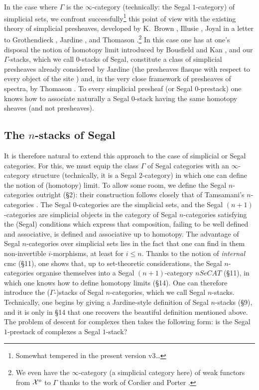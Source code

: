 In the case where $\Gamma$ is the $\infty$-category (technically: the Segal
$1$-category) of simplicial sets, we confront successfully\footnote{Somewhat
tempered in the present version v3\ldots} this point of view with the
existing theory of simplicial presheaves, developed by K.~Brown
\cite{KBrown}, Illusie \cite{Illusie}, Joyal in a letter to Grothendieck
\cite{Joyal}, Jardine \cite{Jardine}, and Thomason \cite{Thomason}.\footnote{We
even have the $\infty$-category (a simplicial category here) of weak functors
from ${\cal X} ^o$ to $\Gamma$ thanks to the work of Cordier and Porter
\cite{CordierPorter}.} In this case one has at one's disposal the notion of
homotopy limit introduced by Bousfield and Kan \cite{BousfieldKan}, and our
$\Gamma$-stacks, which we call $0$-stacks of Segal, constitute a class of
simplicial presheaves already considered by Jardine (the presheaves flasque
with respect to every object of the site \cite{Jardine}) and, in the very
close framework of presheaves of spectra, by Thomason \cite{Thomason}. To
every simplicial presheaf (or Segal $0$-prestack) one knows how to associate
naturally a Segal $0$-stack having the same homotopy sheaves (and not
presheaves).

\subsection*{The \texorpdfstring{$n$}{n}-stacks of Segal}

It is therefore natural to extend this approach to the case of simplicial or
Segal categories. For this, we must equip the class $\Gamma$ of Segal
categories with an $\infty$-category structure (technically, it is a Segal
$2$-category) in which one can define the notion of (homotopy) limit. To
allow some room, we define the Segal $n$-categories outright (\S2): their
construction follows closely that of Tamsamani's $n$-categories
\cite{Tamsamani}. The Segal $0$-categories are the simplicial sets, and the
Segal $(n+1)$-categories are simplicial objects in the category of Segal
$n$-categories satisfying the (Segal) conditions which express that
composition, failing to be well defined and associative, is defined and
associative up to homotopy. The advantage of Segal $n$-categories over
simplicial sets lies in the fact that one can find in them non-invertible
$i$-morphisms, at least for $i \leq n$. Thanks to the notion of
\emph{internal} cmc (\S11), one shows that, up to set-theoretic
considerations, the Segal $n$-categories organise themselves into a Segal
$(n+1)$-category $nSeCAT$ (\S11), in which one knows how to define homotopy
limits (\S14). One can therefore introduce the ($\Gamma$-)stacks of Segal
$n$-categories, which we call Segal $n$-stacks. Technically, one begins by
giving a Jardine-style definition of Segal $n$-stacks (\S9), and it is only
in \S14 that one recovers the beautiful definition mentioned above. The
problem of descent for complexes then takes the following form: is the Segal
$1$-prestack of complexes a Segal $1$-stack?

